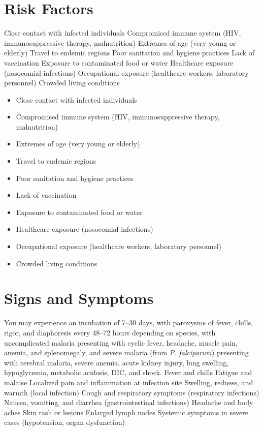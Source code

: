 \section{Risk Factors}
Close contact with infected individuals Compromised immune system (HIV, immunosuppressive therapy, malnutrition) Extremes of age (very young or elderly) Travel to endemic regions Poor sanitation and hygiene practices Lack of vaccination Exposure to contaminated food or water Healthcare exposure (nosocomial infections) Occupational exposure (healthcare workers, laboratory personnel) Crowded living conditions

\begin{itemize}[noitemsep]
  \item Close contact with infected individuals
  \item Compromised immune system (HIV, immunosuppressive therapy, malnutrition)
  \item Extremes of age (very young or elderly)
  \item Travel to endemic regions
  \item Poor sanitation and hygiene practices
  \item Lack of vaccination
  \item Exposure to contaminated food or water
  \item Healthcare exposure (nosocomial infections)
  \item Occupational exposure (healthcare workers, laboratory personnel)
  \item Crowded living conditions
\end{itemize}
\section{Signs and Symptoms}
You may experience an incubation of 7--30 days, with paroxysms of fever, chills, rigor, and diaphoresis every 48--72 hours depending on species, with uncomplicated malaria presenting with cyclic fever, headache, muscle pain, anemia, and splenomegaly, and severe malaria (from \textit{P. falciparum}) presenting with cerebral malaria, severe anemia, acute kidney injury, lung swelling, hypoglycemia, metabolic acidosis, DIC, and shock. Fever and chills Fatigue and malaise Localized pain and inflammation at infection site Swelling, redness, and warmth (local infection) Cough and respiratory symptoms (respiratory infections) Nausea, vomiting, and diarrhea (gastrointestinal infections) Headache and body aches Skin rash or lesions Enlarged lymph nodes Systemic symptoms in severe cases (hypotension, organ dysfunction)

